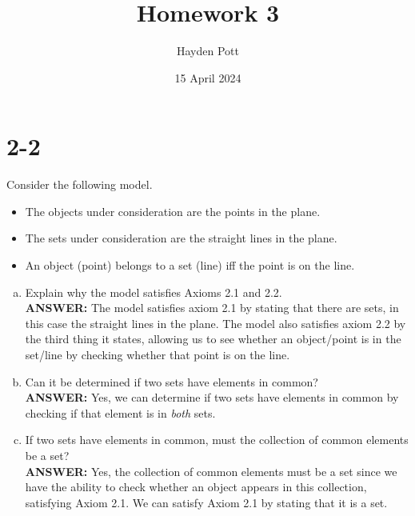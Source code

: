\documentclass{article}
\begin{document}
\title{Homework 3}
\author{Hayden Pott}
\date{15 April 2024}

\maketitle

\section{2-2}
Consider the following model.
\begin{itemize}
    \item The objects under consideration are the points in the plane.
    \item The sets under consideration are the straight lines in the plane.
    \item An object (point) belongs to a set (line) iff the point is on the line.
\end{itemize}

\begin{enumerate}[a)]
    \item Explain why the model satisfies Axioms 2.1 and 2.2. \\
        \textbf{ANSWER:} The model satisfies axiom 2.1 by stating that there are
        sets, in this case the straight lines in the plane.  The model also
        satisfies axiom 2.2 by the third thing it states, allowing us to see
        whether an object/point is in the set/line by checking whether that
        point is on the line.
    \item Can it be determined if two sets have elements in common? \\
        \textbf{ANSWER:} Yes, we can determine if two sets have elements in
        common by checking if that element is in \textit{both} sets.
    \item If two sets have elements in common, must the collection of common
        elements be a set? \\
        \textbf{ANSWER:} Yes, the collection of common elements must be a set
        since we have the ability to check whether an object appears in this
        collection, satisfying Axiom 2.1.  We can satisfy Axiom 2.1 by stating
        that it is a set.
\end{enumerate}
\end{document}

